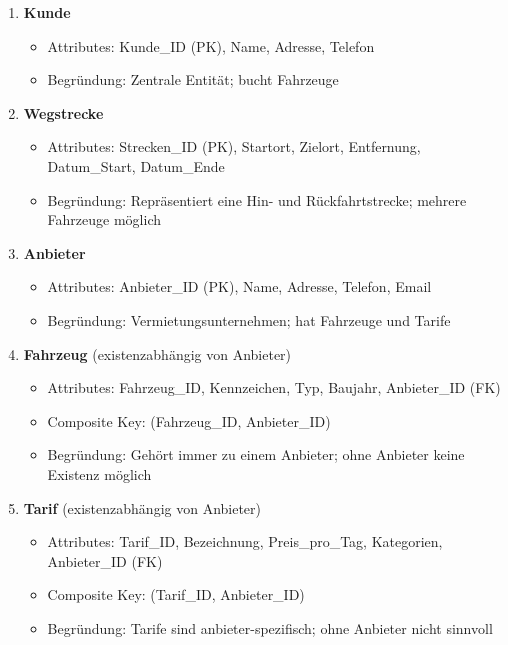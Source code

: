 \documentclass[12pt,a4paper]{article}
\begin{document}
\begin{enumerate}
    \item \textbf{Kunde}
    \begin{itemize}
        \item Attributes: Kunde\_ID (PK), Name, Adresse, Telefon
        \item Begründung: Zentrale Entität; bucht Fahrzeuge
    \end{itemize}

    \item \textbf{Wegstrecke}
    \begin{itemize}
        \item Attributes: Strecken\_ID (PK), Startort, Zielort, Entfernung, Datum\_Start, Datum\_Ende
        \item Begründung: Repräsentiert eine Hin- und Rückfahrtstrecke; mehrere Fahrzeuge möglich
    \end{itemize}

    \item \textbf{Anbieter}
    \begin{itemize}
        \item Attributes: Anbieter\_ID (PK), Name, Adresse, Telefon, Email
        \item Begründung: Vermietungsunternehmen; hat Fahrzeuge und Tarife
    \end{itemize}

    \item \textbf{Fahrzeug} (existenzabhängig von Anbieter)
    \begin{itemize}
        \item Attributes: Fahrzeug\_ID, Kennzeichen, Typ, Baujahr, Anbieter\_ID (FK)
        \item Composite Key: (Fahrzeug\_ID, Anbieter\_ID)
        \item Begründung: Gehört immer zu einem Anbieter; ohne Anbieter keine Existenz möglich
    \end{itemize}

    \item \textbf{Tarif} (existenzabhängig von Anbieter)
    \begin{itemize}
        \item Attributes: Tarif\_ID, Bezeichnung, Preis\_pro\_Tag, Kategorien, Anbieter\_ID (FK)
        \item Composite Key: (Tarif\_ID, Anbieter\_ID)
        \item Begründung: Tarife sind anbieter-spezifisch; ohne Anbieter nicht sinnvoll
    \end{itemize}


\end{enumerate}
\end{document}
